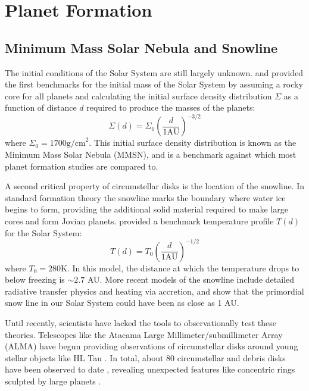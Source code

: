\section{Planet Formation}
\label{sec:PF}
\subsection{Minimum Mass Solar Nebula and Snowline}
The initial conditions of the Solar System are still largely unknown.
\citet{Hayashi1981} and \citet{Weidenschilling1977} provided the first benchmarks for the initial mass of the Solar System by assuming a rocky core for all planets and calculating the initial surface density distribution $\Sigma$ as a function of distance $d$ required to produce the masses of the planets:
\begin{equation}
\Sigma(d) = \Sigma_0\left(\frac{d}{1 \textrm{AU}} \right)^{-3/2}
\end{equation}
where $\Sigma_0 = 1700 \textrm{g/cm}^{2}$. 
This initial surface density distribution is known as the Minimum Mass Solar Nebula (MMSN), and is a benchmark against which most planet formation studies are compared to.


A second critical property of circumstellar disks is the location of the snowline. 
In standard formation theory the snowline marks the boundary where water ice begins to form, providing the additional solid material required to make large cores and form Jovian planets.
\citet{Hayashi1981} provided a benchmark temperature profile $T(d)$ for the Solar System:
\begin{equation}
T(d) = T_0 \left(\frac{d}{1 \textrm{AU}} \right)^{-1/2}
\end{equation}
where $T_0 = 280$K. 
In this model, the distance at which the temperature drops to below freezing is $\sim 2.7$ AU. 
More recent models of the snowline \citep{Sasselov2000} include detailed radiative transfer physics and heating via accretion, and show that the primordial snow line in our Solar System could have been as close as 1 AU.

Until recently, scientists have lacked the tools to observationally test these theories.  
Telescopes like the Atacama Large Millimeter/submillimeter Array (ALMA) have begun providing observations of circumstellar disks around young stellar objects like HL Tau \citep{ALMA2015}.
In total, about 80 circumstellar and debris disks have been observed to date \citep[e.g.][]{Schneider2014,Choquet2016}, revealing unexpected features like concentric rings sculpted by large planets \citep{Tamayo2015}.

